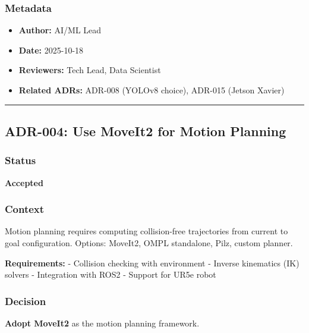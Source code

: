 \documentclass[
]{article}
\providecommand{\tightlist}{%
  \setlength{\itemsep}{0pt}\setlength{\parskip}{0pt}}
\begin{document}
\hypertarget{metadata-2}{%
\subsubsection{Metadata}\label{metadata-2}}

\begin{itemize}
\tightlist
\item
  \textbf{Author:} AI/ML Lead
\item
  \textbf{Date:} 2025-10-18
\item
  \textbf{Reviewers:} Tech Lead, Data Scientist
\item
  \textbf{Related ADRs:} ADR-008 (YOLOv8 choice), ADR-015 (Jetson
  Xavier)
\end{itemize}

\begin{center}\rule{0.5\linewidth}{0.5pt}\end{center}

\hypertarget{adr-004-use-moveit2-for-motion-planning}{%
\subsection{ADR-004: Use MoveIt2 for Motion
Planning}\label{adr-004-use-moveit2-for-motion-planning}}

\hypertarget{status-3}{%
\subsubsection{Status}\label{status-3}}

\textbf{Accepted}

\hypertarget{context-3}{%
\subsubsection{Context}\label{context-3}}

Motion planning requires computing collision-free trajectories from
current to goal configuration. Options: MoveIt2, OMPL standalone, Pilz,
custom planner.

\textbf{Requirements:} - Collision checking with environment - Inverse
kinematics (IK) solvers - Integration with ROS2 - Support for UR5e robot

\hypertarget{decision-3}{%
\subsubsection{Decision}\label{decision-3}}

\textbf{Adopt MoveIt2} as the motion planning framework.
\end{document}
